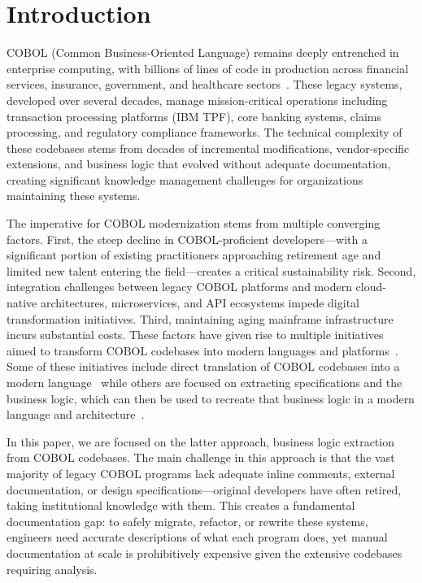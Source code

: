 \section{Introduction}

COBOL (Common Business-Oriented Language) remains deeply entrenched in enterprise computing, with billions of lines of code in production across financial services, insurance, government, and healthcare sectors~\cite{cobolPrevalence}. These legacy systems, developed over several decades, manage mission-critical operations including transaction processing platforms (IBM TPF), core banking systems, claims processing, and regulatory compliance frameworks. The technical complexity of these codebases stems from decades of incremental modifications, vendor-specific extensions, and business logic that evolved without adequate documentation, creating significant knowledge management challenges for organizations maintaining these systems.

The imperative for COBOL modernization stems from multiple converging factors. First, the steep decline in COBOL-proficient developers---with a significant portion of existing practitioners approaching retirement age and limited new talent entering the field---creates a critical sustainability risk. Second, integration challenges between legacy COBOL platforms and modern cloud-native architectures, microservices, and API ecosystems impede digital transformation initiatives. Third, maintaining aging mainframe infrastructure incurs substantial costs. These factors have given rise to multiple initiatives aimed to transform COBOL codebases into modern languages and platforms~\cite{gandhi2024CobolJava,chakravarthy2026enterprise}. Some of these initiatives include direct translation of COBOL codebases into a modern language~\cite{IBM1,IBM2,CobolToPython} while others are focused on extracting specifications and the business logic, which can then be used to recreate that business logic in a modern language and architecture~\cite{cobolSummary1,cobolSummary2}. 

In this paper, we are focused on the latter approach, business logic extraction from COBOL codebases. The main challenge in this approach is that the vast majority of legacy COBOL programs lack adequate inline comments, external documentation, or design specifications---original developers have often retired, taking institutional knowledge with them. This creates a fundamental documentation gap: to safely migrate, refactor, or rewrite these systems, engineers need accurate descriptions of what each program does, yet manual documentation at scale is prohibitively expensive given the extensive codebases requiring analysis.


